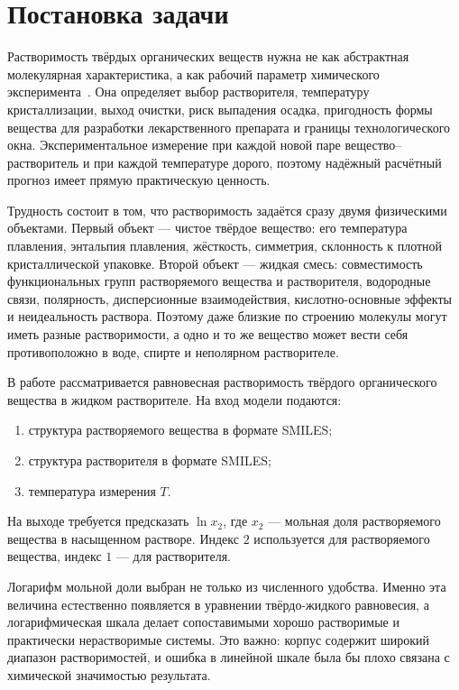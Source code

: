 \documentclass[11pt]{article}
\theoremstyle{definition}
\begin{document}
\section{Постановка задачи}

Растворимость твёрдых органических веществ нужна не как абстрактная молекулярная характеристика, а как рабочий параметр химического эксперимента~\cite{bradley2014,boobier2017,vermeire2022,krasnov2025}. Она определяет выбор растворителя, температуру кристаллизации, выход очистки, риск выпадения осадка, пригодность формы вещества для разработки лекарственного препарата и границы технологического окна. Экспериментальное измерение при каждой новой паре вещество--растворитель и при каждой температуре дорого, поэтому надёжный расчётный прогноз имеет прямую практическую ценность.

Трудность состоит в том, что растворимость задаётся сразу двумя физическими объектами. Первый объект --- чистое твёрдое вещество: его температура плавления, энтальпия плавления, жёсткость, симметрия, склонность к плотной кристаллической упаковке. Второй объект --- жидкая смесь: совместимость функциональных групп растворяемого вещества и растворителя, водородные связи, полярность, дисперсионные взаимодействия, кислотно-основные эффекты и неидеальность раствора. Поэтому даже близкие по строению молекулы могут иметь разные растворимости, а одно и то же вещество может вести себя противоположно в воде, спирте и неполярном растворителе.

В работе рассматривается равновесная растворимость твёрдого органического вещества в жидком растворителе. На вход модели подаются:
\begin{enumerate}
    \item структура растворяемого вещества в формате SMILES;
    \item структура растворителя в формате SMILES;
    \item температура измерения $T$.
\end{enumerate}
На выходе требуется предсказать $\ln x_2$, где $x_2$ --- мольная доля растворяемого вещества в насыщенном растворе. Индекс $2$ используется для растворяемого вещества, индекс $1$ --- для растворителя.

Логарифм мольной доли выбран не только из численного удобства. Именно эта величина естественно появляется в уравнении твёрдо-жидкого равновесия, а логарифмическая шкала делает сопоставимыми хорошо растворимые и практически нерастворимые системы. Это важно: корпус содержит широкий диапазон растворимостей, и ошибка в линейной шкале была бы плохо связана с химической значимостью результата.
\end{document}
